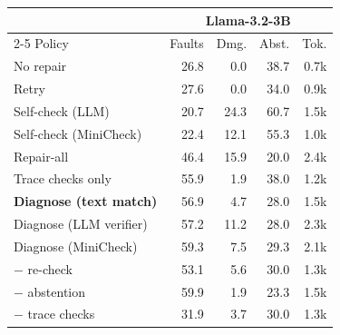 \begin{tabular}{lrrrr}
\toprule
 & \multicolumn{4}{c}{Llama-3.2-3B} \\
\cmidrule(lr){2-5}
Policy & Faults & Dmg. & Abst. & Tok. \\
\midrule
No repair & 26.8 & 0.0 & 38.7 & 0.7k \\
Retry & 27.6 & 0.0 & 34.0 & 0.9k \\
Self-check (LLM) & 20.7 & 24.3 & 60.7 & 1.5k \\
Self-check (MiniCheck) & 22.4 & 12.1 & 55.3 & 1.0k \\
Repair-all & 46.4 & 15.9 & 20.0 & 2.4k \\
Trace checks only & 55.9 & 1.9 & 38.0 & 1.2k \\
\textbf{Diagnose (text match)} & 56.9 & 4.7 & 28.0 & 1.5k \\
Diagnose (LLM verifier) & 57.2 & 11.2 & 28.0 & 2.3k \\
Diagnose (MiniCheck) & 59.3 & 7.5 & 29.3 & 2.1k \\
\midrule
\quad $-$ re-check & 53.1 & 5.6 & 30.0 & 1.3k \\
\quad $-$ abstention & 59.9 & 1.9 & 23.3 & 1.5k \\
\quad $-$ trace checks & 31.9 & 3.7 & 30.0 & 1.3k \\
\bottomrule
\end{tabular}
